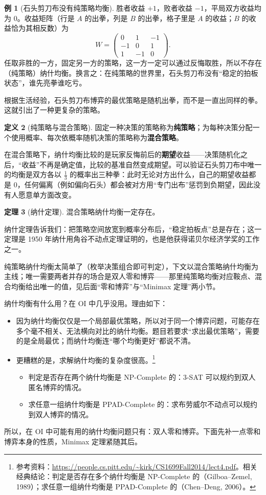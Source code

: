 \documentclass[UTF8,a4paper,11pt,oneside,openany,fontset=fandol]{ctexbook}
\theoremstyle{definition}
\newtheorem{definition}{定义}[chapter]
\newtheorem{theorem}[definition]{定理}
\newtheorem{example}[definition]{例}
\begin{document}
\begin{example}[石头剪刀布没有纯策略均衡]
胜者收益 $+1$，败者收益 $-1$，平局双方收益均为 $0$。收益矩阵（行是 $A$ 的出拳，列是 $B$ 的出拳，格子里是 $A$ 的收益；$B$ 的收益恰为其相反数）为
\[
 W=\begin{pmatrix}0&1&-1\\-1&0&1\\1&-1&0\end{pmatrix}.
\]
任取非胜的一方，固定另一方的策略，这一方一定可以通过反悔取胜，所以不存在（纯策略）纳什均衡。换言之：在纯策略的世界里，石头剪刀布没有“稳定的拍板状态”，谁先亮拳谁吃亏。
\end{example}

根据生活经验，石头剪刀布博弈的最优策略是随机出拳，而不是一直出同样的拳。这就引出了一种更复杂的策略。

\begin{definition}[纯策略与混合策略]
固定一种决策的策略称为\textbf{纯策略}；为每种决策分配一个使用概率、每次依概率随机决策的策略称为\textbf{混合策略}。
\end{definition}

在混合策略下，纳什均衡比较的是玩家反悔前后的\textbf{期望}收益——决策随机化之后，“收益”不再是确定值，比较的基准自然变成期望。可以验证石头剪刀布中唯一的均衡是双方各以 $\tfrac13$ 的概率出三种拳：此时无论对方出什么，自己的期望收益都是 $0$，任何偏离（例如偏向石头）都会被对方用“专门出布”惩罚到负期望，因此没有人愿意单方面改变。

\begin{theorem}[纳什定理]\label{thm:nash}
混合策略纳什均衡一定存在。
\end{theorem}

纳什定理告诉我们：把策略空间放宽到概率分布后，“稳定拍板点”总是存在；这一定理是 1950 年纳什用角谷不动点定理证明的，也是他获得诺贝尔经济学奖的工作之一。

纯策略纳什均衡太简单了（枚举决策组合即可判定），下文以混合策略纳什均衡为主线；唯一需要两者并存的场合是双人零和博弈——那里纯策略均衡对应鞍点、混合均衡给出唯一的值，见后面“零和博弈”与“Minimax 定理”两小节。

纳什均衡有什么用？在 OI 中几乎没用。理由如下：
\begin{itemize}
\item 因为纳什均衡仅仅是一个局部最优策略，所以对于同一个博弈问题，可能存在多个毫不相关、无法横向对比的纳什均衡。题目若要求“求出最优策略”，需要的是全局最优；而纳什均衡连“哪个均衡更好”都说不清。
\item 更糟糕的是，求解纳什均衡的复杂度很高。\footnote{参考资料：\url{https://people.cs.pitt.edu/~kirk/CS1699Fall2014/lect4.pdf}。相关经典结论：判定是否存在多个纳什均衡是 NP-Complete 的（Gilboa--Zemel, 1989）；求任意一组纳什均衡是 PPAD-Complete 的（Chen--Deng, 2006）。}
\begin{itemize}
\item 判定是否存在两个纳什均衡是 NP-Complete 的：3-SAT 可以规约到双人匿名博弈的情况。
\item 求任意一组纳什均衡是 PPAD-Complete 的：求布劳威尔不动点可以规约到双人博弈的情况。
\end{itemize}
\end{itemize}
所以，在 OI 中可能有用的纳什均衡问题只有：双人零和博弈。下面先补一点零和博弈本身的性质，Minimax 定理紧随其后。
\end{document}
